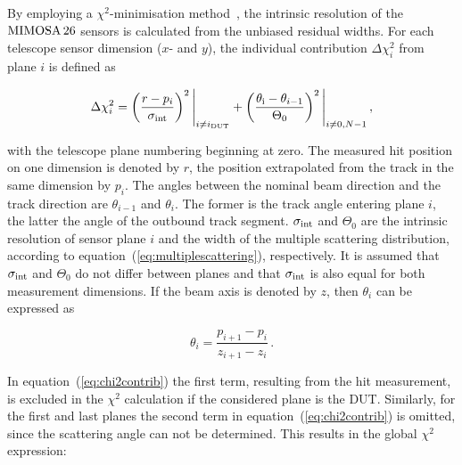% 

By employing a $\chi^{2}$-minimisation method~\cite{ref:eudetmemo_2007_01,ref:lutzpaper}, the intrinsic resolution of the $\textrm{MIMOSA\,26}$ sensors is calculated from the unbiased residual widths.
For each telescope sensor dimension ($x$- and $y$), the individual contribution $\Delta \chi^2_{i}$ from plane $i$ is defined as

\begin{equation}
\label{eq:chi2contrib}
\Delta \chi^2_{i} = \left( \frac{r - p_{i}}{\sigma_{\textrm{int}}} \right)^2 \Bigg|_{i \ne i_{\textrm{DUT}}} +
\left( \frac{\theta_{\textrm{i}} - \theta_{i-1}}{\Theta_{0}} \right)^2 \Bigg|_{i \ne 0,N-1} \,,
\end{equation}

with the telescope plane numbering beginning at zero.
The measured hit position on one dimension is denoted by $r$, the position extrapolated from the track in the same dimension by $p_{i}$.
The angles between the nominal beam direction and the track direction are $\theta_{i-1}$ and $\theta_{i}$.
The former is the track angle entering plane $i$, the latter the angle of the outbound track segment.
$\sigma_{\textrm{int}}$ and $\Theta_{0}$ are the intrinsic resolution of sensor plane $i$ and the width of the multiple scattering distribution, according to equation~(\ref{eq:multiplescattering}), respectively.
It is assumed that $\sigma_{\textrm{int}}$ and $\Theta_{0}$ do not differ between planes and that $\sigma_{\textrm{int}}$ is also equal for both measurement dimensions.
If the beam axis is denoted by $z$, then $\theta_i$ can be expressed as

\begin{equation}
\theta_i = \frac{p_{i+1} - p_i}{z_{i+1} - z_i} \,.
\end{equation}


In equation~(\ref{eq:chi2contrib}) the first term, resulting from the hit measurement, is excluded in the $\chi^2$ calculation if the considered plane is the DUT.
Similarly, for the first and last planes the second term in equation~(\ref{eq:chi2contrib}) is omitted, since the scattering angle can not be determined.
This results in the global $\chi^2$ expression:

